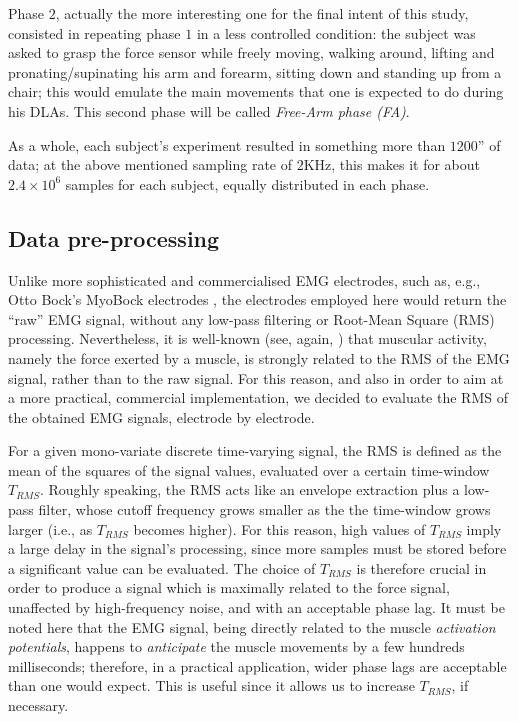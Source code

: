 Phase $2$, actually the more interesting one for the final intent of
this study, consisted in repeating phase $1$ in a less controlled
condition: the subject was asked to grasp the force sensor while
freely moving, walking around, lifting and pronating/supinating his
arm and forearm, sitting down and standing up from a chair; this would
emulate the main movements that one is expected to do during his DLAs.
This second phase will be called \emph{Free-Arm phase (FA)}.

As a whole, each subject's experiment resulted in something more than
$1200$'' of data; at the above mentioned sampling rate of $2$KHz, this
makes it for about $2.4\times 10^6$ samples for each subject, equally
distributed in each phase.

\subsection{Data pre-processing}

Unlike more sophisticated and commercialised EMG electrodes, such as,
e.g., Otto Bock's MyoBock electrodes \cite{ottobock}, the electrodes
employed here would return the ``raw'' EMG signal, without any
low-pass filtering or Root-Mean Square (RMS) processing. Nevertheless,
it is well-known (see, again, \cite{deluca,zecca}) that muscular
activity, namely the force exerted by a muscle, is strongly related to
the RMS of the EMG signal, rather than to the raw signal. For this
reason, and also in order to aim at a more practical, commercial
implementation, we decided to evaluate the RMS of the obtained EMG
signals, electrode by electrode.

For a given mono-variate discrete time-varying signal, the RMS is
defined as the mean of the squares of the signal values, evaluated
over a certain time-window $T_{RMS}$. Roughly speaking, the RMS acts
like an envelope extraction plus a low-pass filter, whose cutoff
frequency grows smaller as the the time-window grows larger (i.e., as
$T_{RMS}$ becomes higher). For this reason, high values of $T_{RMS}$
imply a large delay in the signal's processing, since more samples
must be stored before a significant value can be evaluated. The choice
of $T_{RMS}$ is therefore crucial in order to produce a signal which
is maximally related to the force signal, unaffected by high-frequency
noise, and with an acceptable phase lag. It must be noted here that the
EMG signal, being directly related to the muscle \emph{activation
potentials}, happens to \emph{anticipate} the muscle movements by a
few hundreds milliseconds; therefore, in a practical application,
wider phase lags are acceptable than one would expect. This is useful
since it allows us to increase $T_{RMS}$, if necessary.

